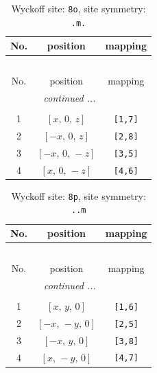 \documentclass[fleqn,8pt]{jsarticle}
\begin{document}
\renewcommand{\arraystretch}{1.2}
\begin{longtable}{ccc}
\caption{Wyckoff site: {\tt 8o}, site symmetry: {\tt .m.}}
 \\
 \hline \hline
No. & position & mapping \\ \hline \endfirsthead

\multicolumn{2}{l}{\tablename\ \thetable{}} \\
 \hline \hline
No. & position & mapping \\ \hline \endhead

 \hline \hline
\multicolumn{2}{r}{\footnotesize\it continued ...} \\ \endfoot

 \hline \hline
\multicolumn{2}{r}{} \\ \endlastfoot

1 & $\left[ x,\, 0,\, z \right]$ & {\tt [1,7]} \\ \hline
2 & $\left[ - x,\, 0,\, z \right]$ & {\tt [2,8]} \\ \hline
3 & $\left[ - x,\, 0,\, - z \right]$ & {\tt [3,5]} \\ \hline
4 & $\left[ x,\, 0,\, - z \right]$ & {\tt [4,6]} \\
\end{longtable}
\renewcommand{\arraystretch}{1.2}
\begin{longtable}{ccc}
\caption{Wyckoff site: {\tt 8p}, site symmetry: {\tt ..m}}
 \\
 \hline \hline
No. & position & mapping \\ \hline \endfirsthead

\multicolumn{2}{l}{\tablename\ \thetable{}} \\
 \hline \hline
No. & position & mapping \\ \hline \endhead

 \hline \hline
\multicolumn{2}{r}{\footnotesize\it continued ...} \\ \endfoot

 \hline \hline
\multicolumn{2}{r}{} \\ \endlastfoot

1 & $\left[ x,\, y,\, 0 \right]$ & {\tt [1,6]} \\ \hline
2 & $\left[ - x,\, - y,\, 0 \right]$ & {\tt [2,5]} \\ \hline
3 & $\left[ - x,\, y,\, 0 \right]$ & {\tt [3,8]} \\ \hline
4 & $\left[ x,\, - y,\, 0 \right]$ & {\tt [4,7]} \\
\end{longtable}
\end{document}
